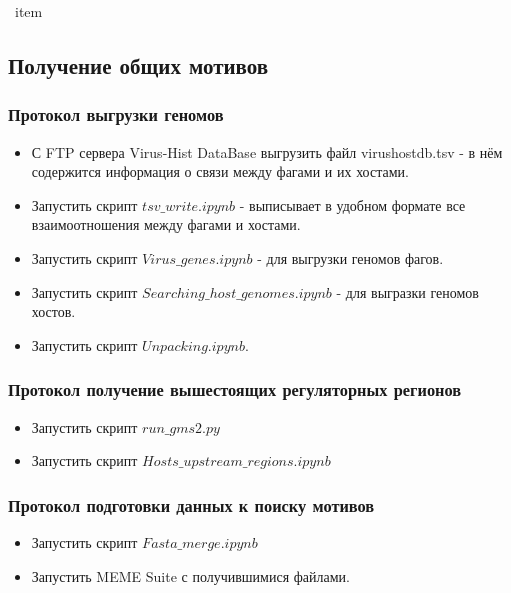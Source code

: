 \documentclass[a4paper,12pt]{article}
\begin{document}
\begin{center}
\     item \subsection{Получение общих мотивов}
      \item  \subsubsection{Протокол выгрузки геномов}
\end{center}
    \begin{itemize}
        \item С FTP сервера Virus-Hist DataBase выгрузить файл virushostdb.tsv - в нём содержится информация о связи между фагами и их хостами.
    
        \item Запустить скрипт \(tsv\_write.ipynb\) - выписывает в удобном формате все взаимоотношения между фагами и хостами.
    
      \item Запустить скрипт \(Virus\_genes.ipynb\) - для выгрузки геномов фагов.
        \item Запустить скрипт \(Searching\_host\_genomes.ipynb\) - для выгразки геномов хостов.
        \item Запустить скрипт \(Unpacking.ipynb\).

    \end{itemize}

    \begin{center}
    \item \subsubsection{Протокол получение вышестоящих регуляторных регионов}
    \end{center}
        \begin{itemize}
            \item Запустить скрипт \(run\_gms2.py\)
            \item Запустить скрипт \(Hosts\_upstream\_regions.ipynb\)
        \end{itemize}
    \begin{center}
    \item \subsubsection{Протокол подготовки данных к поиску мотивов}
    \end{center}
        \begin{itemize}
            \item Запустить скрипт \(Fasta\_merge.ipynb\)
            \item Запустить MEME Suite с получившимися файлами.
        \end{itemize}
\end{document}
